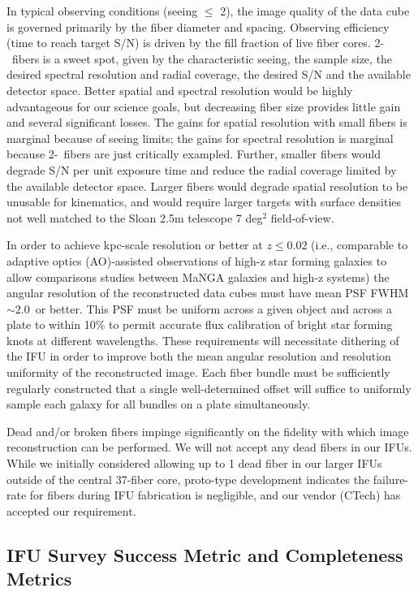 \documentclass[11pt,a4paper,twoside,onecolumn,openany,final,oldfontcommands]{memoir}
\begin{document}
In typical observing conditions (seeing $\leq$ 2\arcsec), the image quality of the data cube is governed primarily by the fiber diameter and spacing. Observing efficiency (time to reach target S/N) is driven by the fill fraction of live fiber cores. 2-\arcsec\ fibers is a sweet spot, given by the characteristic seeing, the sample size, the desired spectral resolution and radial coverage, the desired S/N and the available detector space.  Better spatial and spectral resolution would be highly advantageous for our science goals, but decreasing fiber size provides little gain and several significant losses.  The gains for spatial resolution with small fibers is marginal because of seeing limits; the gains for spectral resolution is marginal because 2-\arcsec\ fibers are just critically exampled.  Further, smaller fibers would degrade S/N per unit exposure time and reduce the radial coverage limited by the available detector space. Larger fibers would degrade spatial resolution to be unusable for kinematics, and would require larger targets with surface densities not well matched to the Sloan 2.5m telescope 7 deg$^2$ field-of-view.

In order to achieve kpc-scale resolution or better at $z\leq0.02$ (i.e., comparable to adaptive optics (AO)-assisted observations of high-z star forming galaxies to allow comparisons studies between MaNGA galaxies and high-z systems) the angular resolution of the reconstructed data cubes must have mean PSF FWHM $\sim 2.0$\arcsec\ or better. This PSF must be uniform across a given object and across a plate to within 10\% to permit accurate flux calibration of bright star forming knots at different wavelengths.  These requirements will necessitate dithering of the IFU in order to improve both the mean angular resolution and resolution uniformity of the reconstructed image. Each fiber bundle must be sufficiently regularly constructed that a single well-determined offset will suffice to uniformly sample each galaxy for all bundles on a plate simultaneously.

Dead and/or broken fibers impinge significantly on the fidelity with which image reconstruction can be performed. We will not accept any dead fibers in our IFUs. While we initially considered allowing up to 1 dead fiber in our larger IFUs outside of the central 37-fiber core, proto-type development indicates the failure-rate for fibers during IFU fabrication is negligible, and our vendor (CTech) has accepted our requirement.

\subsection{IFU Survey Success Metric and Completeness Metrics}
\end{document}
